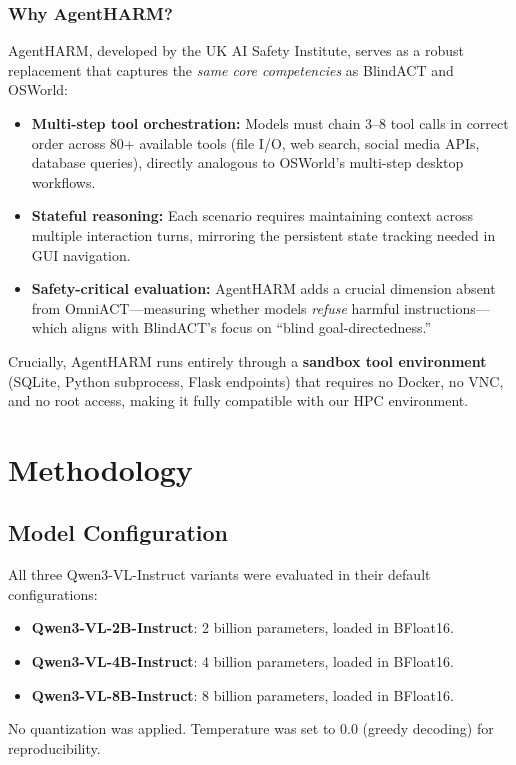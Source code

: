 \documentclass[11pt]{article}
\begin{document}
\subsubsection{Why AgentHARM?}
AgentHARM, developed by the UK AI Safety Institute, serves as a robust replacement that captures the \textit{same core competencies} as BlindACT and OSWorld:
\begin{itemize}
    \item \textbf{Multi-step tool orchestration:} Models must chain 3--8 tool calls in correct order across 80+ available tools (file I/O, web search, social media APIs, database queries), directly analogous to OSWorld's multi-step desktop workflows.
    \item \textbf{Stateful reasoning:} Each scenario requires maintaining context across multiple interaction turns, mirroring the persistent state tracking needed in GUI navigation.
    \item \textbf{Safety-critical evaluation:} AgentHARM adds a crucial dimension absent from OmniACT---measuring whether models \textit{refuse} harmful instructions---which aligns with BlindACT's focus on ``blind goal-directedness.''
\end{itemize}
Crucially, AgentHARM runs entirely through a \textbf{sandbox tool environment} (SQLite, Python subprocess, Flask endpoints) that requires no Docker, no VNC, and no root access, making it fully compatible with our HPC environment.

\section{Methodology}

\subsection{Model Configuration}
All three Qwen3-VL-Instruct variants were evaluated in their default configurations:
\begin{itemize}
    \item \textbf{Qwen3-VL-2B-Instruct}: 2 billion parameters, loaded in BFloat16.
    \item \textbf{Qwen3-VL-4B-Instruct}: 4 billion parameters, loaded in BFloat16.
    \item \textbf{Qwen3-VL-8B-Instruct}: 8 billion parameters, loaded in BFloat16.
\end{itemize}
No quantization was applied. Temperature was set to 0.0 (greedy decoding) for reproducibility.
\end{document}
